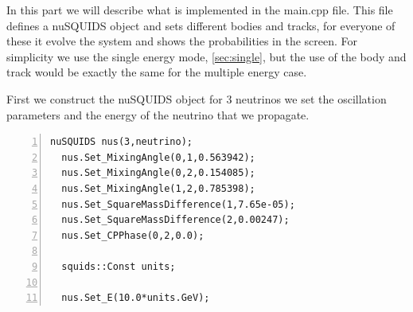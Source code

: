 In this part we will describe what is implemented in the {\ttf
  main.cpp} file.
This file defines a nuSQUIDS object and sets different bodies and
tracks, for everyone of these it evolve the system and shows the
probabilities in the screen.
For simplicity we use the single energy mode, \ref{sec:single}, but the use of the body
and track would be exactly the same for the multiple energy case.

First we construct the nuSQUIDS object for 3 neutrinos we set the
oscillation parameters and the energy of the neutrino that we
propagate.

\begin{lstlisting}[frame=leftline, numbers =
  left,breaklines=true,label = ex:sin1]
  nuSQUIDS nus(3,neutrino);
  nus.Set_MixingAngle(0,1,0.563942);
  nus.Set_MixingAngle(0,2,0.154085);
  nus.Set_MixingAngle(1,2,0.785398);
  nus.Set_SquareMassDifference(1,7.65e-05);
  nus.Set_SquareMassDifference(2,0.00247);
  nus.Set_CPPhase(0,2,0.0);

  squids::Const units;

  nus.Set_E(10.0*units.GeV);
\end{lstlisting}

